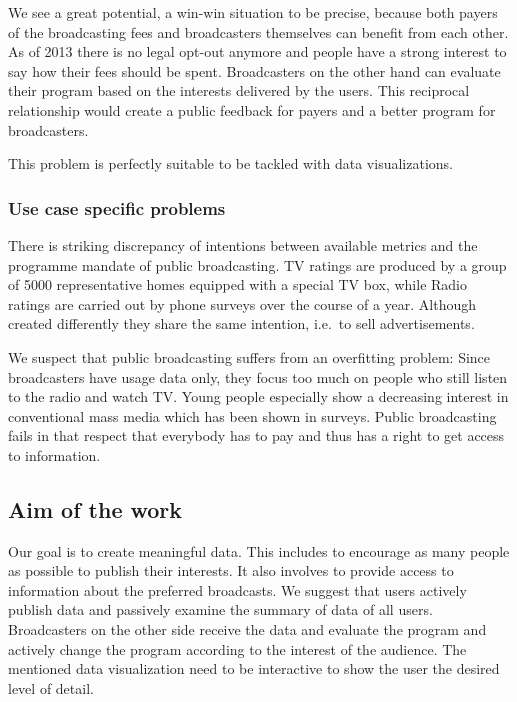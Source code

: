 \documentclass{article}
\begin{document}
We see a great potential, a win-win situation to be precise, because both payers of the broadcasting fees and broadcasters themselves can benefit from each other.
As of 2013 there is no legal opt-out anymore and people have a strong interest to say how their fees should be spent.
Broadcasters on the other hand can evaluate their program based on the interests delivered by the users.
This reciprocal relationship would create a public feedback for payers and a better program for broadcasters.

This problem is perfectly suitable to be tackled with data visualizations.

\subsubsection{Use case specific problems}
There is striking discrepancy of intentions between available metrics and the programme mandate of public broadcasting.
TV ratings are produced by a group of 5000 representative homes equipped with a special TV box, while Radio ratings are carried out by phone surveys over the course of a year.
Although created differently they share the same intention, i.e.\ to sell advertisements.

We suspect that public broadcasting suffers from an overfitting problem:
Since broadcasters have usage data only, they focus too much on people who still listen to the radio and watch TV.
Young people especially show a decreasing interest in conventional mass media which has been shown in surveys.
Public broadcasting fails in that respect that everybody has to pay and thus has a right to get access to information.


\subsection{Aim of the work}
Our goal is to create meaningful data.
This includes to encourage as many people as possible to publish their interests.
It also involves to provide access to information about the preferred broadcasts.
We suggest that users actively publish data and passively examine the summary of data of all users.
Broadcasters on the other side receive the data and evaluate the program and actively change the program according to the interest of the audience.
The mentioned data visualization need to be interactive to show the user the desired level of detail.
\end{document}
